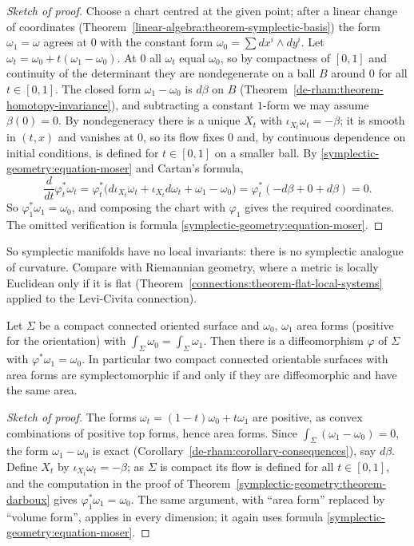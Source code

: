 \begin{proof}[Sketch of proof]
Choose a chart centred at the given point; after a linear change of coordinates (Theorem~\ref{linear-algebra:theorem-symplectic-basis}) the form $\omega_1 = \omega$ agrees at $0$ with the constant form
$\omega_0 = \sum dx^i \wedge dy^i$. Let $\omega_t = \omega_0 + t(\omega_1 - \omega_0)$. At $0$ all $\omega_t$ equal $\omega_0$, so by compactness of $[0, 1]$ and continuity of the determinant they are
nondegenerate on a ball $B$ around $0$ for all $t \in [0, 1]$. The closed form $\omega_1 - \omega_0$ is $d\beta$ on $B$ (Theorem~\ref{de-rham:theorem-homotopy-invariance}), and subtracting a constant
$1$-form we may assume $\beta(0) = 0$. By nondegeneracy there is a unique $X_t$ with $\iota_{X_t}\omega_t = -\beta$; it is smooth in $(t, x)$ and vanishes at $0$, so its flow fixes $0$ and, by continuous
dependence on initial conditions, is defined for $t \in [0, 1]$ on a smaller ball. By \eqref{symplectic-geometry:equation-moser} and Cartan's formula,
\[
\frac{d}{dt}\varphi_t^*\omega_t = \varphi_t^*\bigl(d\iota_{X_t}\omega_t + \iota_{X_t}d\omega_t + \omega_1 - \omega_0\bigr) = \varphi_t^*(-d\beta + 0 + d\beta) = 0 .
\]
So $\varphi_1^*\omega_1 = \omega_0$, and composing the chart with $\varphi_1$ gives the required coordinates. The omitted verification is formula \eqref{symplectic-geometry:equation-moser}.
\end{proof}

So symplectic manifolds have no local invariants: there is no symplectic analogue of curvature. Compare with Riemannian geometry, where a metric is locally Euclidean only if it is flat
(Theorem~\ref{connections:theorem-flat-local-systems} applied to the Levi-Civita connection).

\begin{theorem}[Moser]\label{symplectic-geometry:theorem-moser-area}
Let $\Sigma$ be a compact connected oriented surface and $\omega_0$, $\omega_1$ area forms (positive for the orientation) with $\int_\Sigma\omega_0 = \int_\Sigma\omega_1$. Then there is a diffeomorphism
$\varphi$ of $\Sigma$ with $\varphi^*\omega_1 = \omega_0$. In particular two compact connected orientable surfaces with area forms are symplectomorphic if and only if they are diffeomorphic and have the same area.
\end{theorem}

\begin{proof}[Sketch of proof]
The forms $\omega_t = (1 - t)\omega_0 + t\omega_1$ are positive, as convex combinations of positive top forms, hence area forms. Since $\int_\Sigma(\omega_1 - \omega_0) = 0$, the form $\omega_1 - \omega_0$ is
exact (Corollary~\ref{de-rham:corollary-consequences}), say $d\beta$. Define $X_t$ by $\iota_{X_t}\omega_t = -\beta$; as $\Sigma$ is compact its flow is defined for all $t \in [0, 1]$, and the computation in the
proof of Theorem~\ref{symplectic-geometry:theorem-darboux} gives $\varphi_1^*\omega_1 = \omega_0$. The same argument, with ``area form'' replaced by ``volume form'', applies in every dimension; it again uses
formula \eqref{symplectic-geometry:equation-moser}.
\end{proof}

